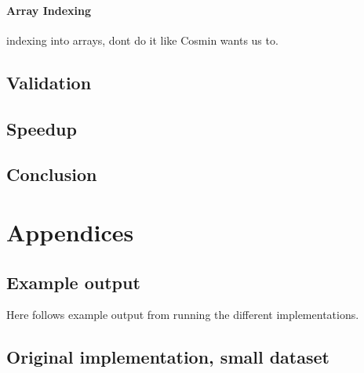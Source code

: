 \documentclass[11pt]{article}
\begin{document}
\paragraph{Array Indexing\\}
indexing into arrays, dont do it like Cosmin wants us to.

\subsection{Validation}

\subsection{Speedup}
\begin{table}[h]
\centering
{}
\caption{Speedup comparison of the original implementation, the OpenMP implementation and the CUDA implementation}
\label{table:cudatime}
\end{table}

\subsection{Conclusion}

\newpage
\section{Appendices}
\subsection{Example output}
Here follows example output from running the different implementations.

\subsection{Original implementation, small dataset}

\end{document}
